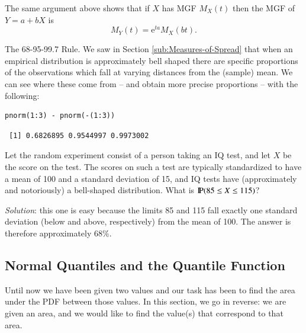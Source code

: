 \documentclass[captions=tableheading]{scrbook}
\begin{document}
\begin{fact}
The same argument above shows that if \(X\) has MGF \(M_{X}(t)\) then the MGF of \(Y=a+bX\) is
\begin{equation}
M_{Y}(t)=\mathrm{e}^{ta}M_{X}(bt).
\end{equation}
\end{fact}

\begin{example}
The 68-95-99.7 Rule. We saw in Section \ref{sub:Measures-of-Spread} that when an empirical distribution is approximately bell shaped there are specific proportions of the observations which fall at varying distances from the (sample) mean. We can see where these come from -- and obtain more precise proportions -- with the following:
\end{example}


\begin{verbatim}
pnorm(1:3) - pnorm(-(1:3))
\end{verbatim}

\begin{verbatim}
 [1] 0.6826895 0.9544997 0.9973002
\end{verbatim}

\begin{example}
\label{exa:iq-model}
Let the random experiment consist of a person taking an IQ test, and let \(X\) be the score on the test. The scores on such a test are typically standardized to have a mean of 100 and a standard deviation of 15, and IQ tests have (approximately and notoriously) a bell-shaped distribution. What is \(\P(85\leq X\leq115)\)?

\emph{Solution}: this one is easy because the limits 85 and 115 fall exactly one standard deviation (below and above, respectively) from the mean of 100. The answer is therefore approximately 68\%.
\end{example}
\subsection{Normal Quantiles and the Quantile Function}
\label{sec-6-3-1}

\label{sub:Normal-Quantiles-QF}

Until now we have been given two values and our task has been to find the area under the PDF between those values. In this section, we go in reverse: we are given an area, and we would like to find the value(s) that correspond to that area. 
\end{document}
